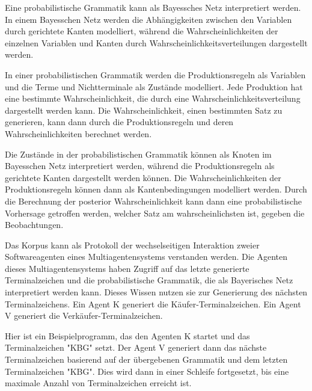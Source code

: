 \documentclass[12pt]{article}
\begin{document}
Eine probabilistische Grammatik kann als Bayessches Netz interpretiert werden. In einem Bayesschen Netz werden die Abhängigkeiten zwischen den Variablen durch gerichtete Kanten modelliert, während die Wahrscheinlichkeiten der einzelnen Variablen und Kanten durch Wahrscheinlichkeitsverteilungen dargestellt werden.

In einer probabilistischen Grammatik werden die Produktionsregeln als Variablen und die Terme und Nichtterminale als Zustände modelliert. Jede Produktion hat eine bestimmte Wahrscheinlichkeit, die durch eine Wahrscheinlichkeitsverteilung dargestellt werden kann. Die Wahrscheinlichkeit, einen bestimmten Satz zu generieren, kann dann durch die Produktionsregeln und deren Wahrscheinlichkeiten berechnet werden.

Die Zustände in der probabilistischen Grammatik können als Knoten im Bayesschen Netz interpretiert werden, während die Produktionsregeln als gerichtete Kanten dargestellt werden können. Die Wahrscheinlichkeiten der Produktionsregeln können dann als Kantenbedingungen modelliert werden. Durch die Berechnung der posterior Wahrscheinlichkeit kann dann eine probabilistische Vorhersage getroffen werden, welcher Satz am wahrscheinlichsten ist, gegeben die Beobachtungen.





Das Korpus kann als Protokoll der wechselseitigen Interaktion zweier Softwareagenten eines Multiagentensystems verstanden werden. Die Agenten dieses Multiagentensystems haben Zugriff auf das letzte generierte Terminalzeichen und die probabilistische Grammatik, die als Bayerisches Netz interpretiert werden kann. Dieses Wissen nutzen sie zur Generierung des nächsten Terminalzeichens. Ein Agent K generiert die Käufer-Terminalzeichen. Ein Agent V generiert die Verkäufer-Terminalzeichen.

Hier ist ein Beispielprogramm, das den Agenten K startet und das Terminalzeichen "KBG" setzt. Der Agent V generiert dann das nächste Terminalzeichen basierend auf der übergebenen Grammatik und dem letzten Terminalzeichen "KBG". Dies wird dann in einer Schleife fortgesetzt, bis eine maximale Anzahl von Terminalzeichen erreicht ist.
\end{document}
